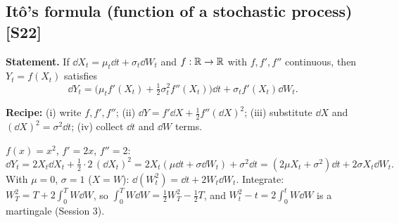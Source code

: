\documentclass[10pt]{article}
\begin{document}
\begin{where}
\end{where}

\subsection{It\^o's formula (function of a stochastic process) [S22]}
\textbf{Statement.} If $\dd X_t=\mu_t\dd t+\sigma_t\dd W_t$ and $f:\mathbb{R}\to\mathbb{R}$ with $f,f',f''$ continuous, then $Y_t=f(X_t)$ satisfies
\[\dd Y_t=\Big(\mu_tf'(X_t)+\tfrac12\sigma_t^2f''(X_t)\Big)\dd t+\sigma_tf'(X_t)\dd W_t.\]
\begin{where}
\end{where}
\textbf{Recipe:} (i) write $f,f',f''$; (ii) $\dd Y=f'\dd X+\frac12f''(\dd X)^2$; (iii) substitute $\dd X$ and $(\dd X)^2=\sigma^2\dd t$; (iv) collect $\dd t$ and $\dd W$ terms.
\begin{deriv}[{Slide example {[S22]} (worked here): $\dd X_t=\mu\dd t+\sigma\dd W_t$, $Y_t=X_t^2$}]
$f(x)=x^2$, $f'=2x$, $f''=2$:
\[\dd Y_t=2X_t\dd X_t+\tfrac12\cdot2\,(\dd X_t)^2=2X_t(\mu\dd t+\sigma\dd W_t)+\sigma^2\dd t=(2\mu X_t+\sigma^2)\dd t+2\sigma X_t\dd W_t.\]
\beyond{} With $\mu=0$, $\sigma=1$ ($X=W$): $\dd(W_t^2)=\dd t+2W_t\dd W_t$. Integrate: $W_T^2=T+2\int_0^TW\dd W$, so $\int_0^TW\dd W=\frac12W_T^2-\frac12T$, and $W_t^2-t=2\int_0^tW\dd W$ is a martingale (Session 3).
\end{deriv}
\end{document}
